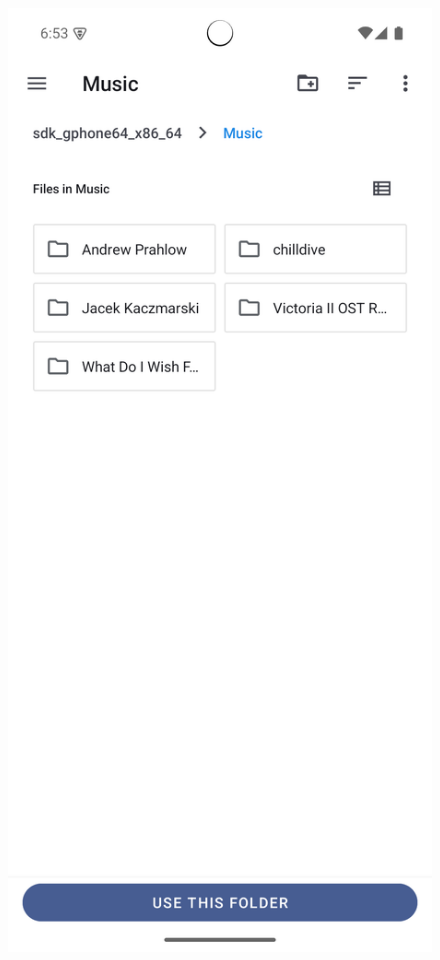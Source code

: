 \begin{figure}[H]
	\caption{}
	\label{fig:test_select_folder}
\end{figure}

\begin{figure}[H]
	\centering
	\includegraphics[width=1\textwidth]{images/tutorial_folder_selected.png}
	\caption{}
	\label{fig:test_folder_selected}
\end{figure}

